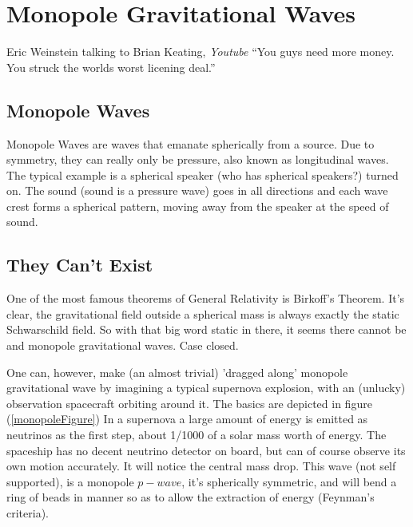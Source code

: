 \documentclass[../rzero]{subfiles}
\begin{document}
\chapter{Monopole Gravitational Waves}\label{monopoleGravitationalWavesChapter}

\begin{chapquote}{Eric Weinstein talking to Brian Keating, \textit{Youtube\cite{drbriankeatingEricWeinsteinTheoretical2020}}}
``You guys need more money. You struck the worlds worst licening deal.''
\end{chapquote}

\section{Monopole Waves}
Monopole Waves are waves that emanate spherically from a source. Due to symmetry, they can really only be pressure, also known as longitudinal waves. The typical example is a spherical speaker (who has spherical speakers?) turned on. The sound (sound is a pressure wave) goes in all directions and each wave crest forms a spherical pattern, moving away from the speaker at the speed of sound. 

\section{They Can't Exist}
One of the most famous theorems of General Relativity is Birkoff's Theorem\cite{Birkhoff1923}. It's clear, the gravitational field outside a spherical mass is always exactly the static Schwarschild field. So with that big word static in there, it seems there cannot be and monopole gravitational waves. Case closed. 

One can, however, make (an almost trivial) 'dragged along' monopole gravitational wave by imagining a typical supernova explosion, with an (unlucky) observation spacecraft orbiting around it. The basics are depicted in figure (\ref{monopoleFigure}) In a supernova a large amount of energy is emitted as neutrinos as the first step, about 1/1000 of a solar mass worth of energy. The spaceship has no decent neutrino detector on board, but can of course observe its own motion accurately. It will notice the central mass drop. This wave (not self supported), is a monopole $p-wave$, it's spherically symmetric, and will bend a ring of beads in manner so as to allow the extraction of energy (Feynman's criteria).  
\end{document}
